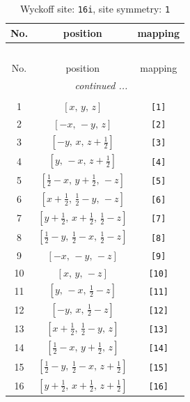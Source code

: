 \documentclass[fleqn,8pt]{jsarticle}
\begin{document}
\begin{longtable}{ccc}
\caption{Wyckoff site: {\tt 16i}, site symmetry: {\tt 1}}
 \\
 \hline \hline
No. & position & mapping \\ \hline \endfirsthead

\multicolumn{2}{l}{\tablename\ \thetable{}} \\
 \hline \hline
No. & position & mapping \\ \hline \endhead

 \hline \hline
\multicolumn{2}{r}{\footnotesize\it continued ...} \\ \endfoot

 \hline \hline
\multicolumn{2}{r}{} \\ \endlastfoot

1 & $\left[ x,\, y,\, z \right]$ & {\tt [1]} \\ \hline
2 & $\left[ - x,\, - y,\, z \right]$ & {\tt [2]} \\ \hline
3 & $\left[ - y,\, x,\, z + \frac{1}{2} \right]$ & {\tt [3]} \\ \hline
4 & $\left[ y,\, - x,\, z + \frac{1}{2} \right]$ & {\tt [4]} \\ \hline
5 & $\left[ \frac{1}{2} - x,\, y + \frac{1}{2},\, - z \right]$ & {\tt [5]} \\ \hline
6 & $\left[ x + \frac{1}{2},\, \frac{1}{2} - y,\, - z \right]$ & {\tt [6]} \\ \hline
7 & $\left[ y + \frac{1}{2},\, x + \frac{1}{2},\, \frac{1}{2} - z \right]$ & {\tt [7]} \\ \hline
8 & $\left[ \frac{1}{2} - y,\, \frac{1}{2} - x,\, \frac{1}{2} - z \right]$ & {\tt [8]} \\ \hline
9 & $\left[ - x,\, - y,\, - z \right]$ & {\tt [9]} \\ \hline
10 & $\left[ x,\, y,\, - z \right]$ & {\tt [10]} \\ \hline
11 & $\left[ y,\, - x,\, \frac{1}{2} - z \right]$ & {\tt [11]} \\ \hline
12 & $\left[ - y,\, x,\, \frac{1}{2} - z \right]$ & {\tt [12]} \\ \hline
13 & $\left[ x + \frac{1}{2},\, \frac{1}{2} - y,\, z \right]$ & {\tt [13]} \\ \hline
14 & $\left[ \frac{1}{2} - x,\, y + \frac{1}{2},\, z \right]$ & {\tt [14]} \\ \hline
15 & $\left[ \frac{1}{2} - y,\, \frac{1}{2} - x,\, z + \frac{1}{2} \right]$ & {\tt [15]} \\ \hline
16 & $\left[ y + \frac{1}{2},\, x + \frac{1}{2},\, z + \frac{1}{2} \right]$ & {\tt [16]} \\
\end{longtable}
\end{document}
